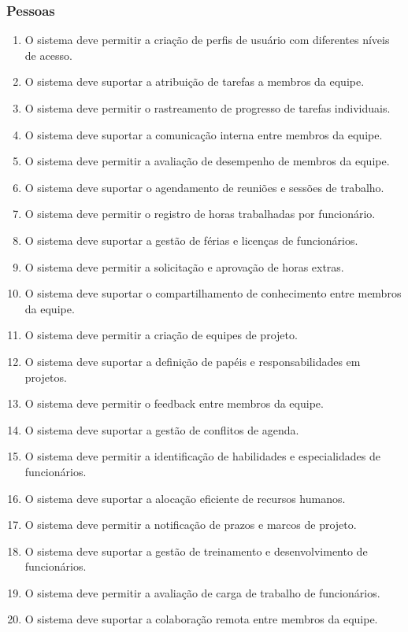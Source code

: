 \subsubsection{Pessoas}
\begin{enumerate}
  \item O sistema deve permitir a criação de perfis de usuário com diferentes níveis de acesso.
  \item O sistema deve suportar a atribuição de tarefas a membros da equipe.
  \item O sistema deve permitir o rastreamento de progresso de tarefas individuais.
  \item O sistema deve suportar a comunicação interna entre membros da equipe.
  \item O sistema deve permitir a avaliação de desempenho de membros da equipe.
  \item O sistema deve suportar o agendamento de reuniões e sessões de trabalho.
  \item O sistema deve permitir o registro de horas trabalhadas por funcionário.
  \item O sistema deve suportar a gestão de férias e licenças de funcionários.
  \item O sistema deve permitir a solicitação e aprovação de horas extras.
  \item O sistema deve suportar o compartilhamento de conhecimento entre membros da equipe.
  \item O sistema deve permitir a criação de equipes de projeto.
  \item O sistema deve suportar a definição de papéis e responsabilidades em projetos.
  \item O sistema deve permitir o feedback entre membros da equipe.
  \item O sistema deve suportar a gestão de conflitos de agenda.
  \item O sistema deve permitir a identificação de habilidades e especialidades de funcionários.
  \item O sistema deve suportar a alocação eficiente de recursos humanos.
  \item O sistema deve permitir a notificação de prazos e marcos de projeto.
  \item O sistema deve suportar a gestão de treinamento e desenvolvimento de funcionários.
  \item O sistema deve permitir a avaliação de carga de trabalho de funcionários.
  \item O sistema deve suportar a colaboração remota entre membros da equipe.
\end{enumerate}

